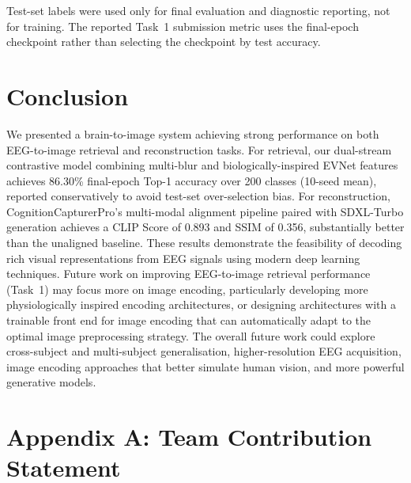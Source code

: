 \documentclass[11pt]{article}
\begin{document}
Test-set labels were used only for final evaluation and diagnostic reporting, not for training.
The reported Task~1 submission metric uses the final-epoch checkpoint rather than selecting the checkpoint by test accuracy.

\section{Conclusion}

We presented a brain-to-image system achieving strong performance on both EEG-to-image retrieval and reconstruction tasks.
For retrieval, our dual-stream contrastive model combining multi-blur and biologically-inspired EVNet features achieves 86.30\% final-epoch Top-1 accuracy over 200 classes (10-seed mean), reported conservatively to avoid test-set over-selection bias.
For reconstruction, CognitionCapturerPro's multi-modal alignment pipeline paired with SDXL-Turbo generation achieves a CLIP Score of 0.893 and SSIM of 0.356, substantially better than the unaligned baseline.
These results demonstrate the feasibility of decoding rich visual representations from EEG signals using modern deep learning techniques. Future work on improving EEG-to-image retrieval performance (Task~1) may focus more on image encoding, particularly developing more physiologically inspired encoding architectures, or designing architectures with a trainable front end for image encoding that can automatically adapt to the optimal image preprocessing strategy.
The overall future work could explore cross-subject and multi-subject generalisation, higher-resolution EEG acquisition, image encoding approaches that better simulate human vision, and more powerful generative models.




\appendix
\section*{Appendix A: Team Contribution Statement}

\end{document}
